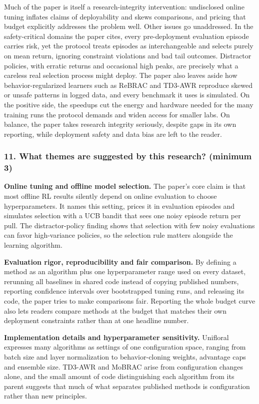 \documentclass[11pt]{article}
\newcommand{\question}[1]{\subsubsection*{#1}}
\begin{document}
Much of the paper is itself a research-integrity intervention: undisclosed online tuning inflates claims of deployability and skews comparisons, and pricing that budget explicitly addresses the problem well. Other issues go unaddressed. In the safety-critical domains the paper cites, every pre-deployment evaluation episode carries risk, yet the protocol treats episodes as interchangeable and selects purely on mean return, ignoring constraint violations and bad tail outcomes. Distractor policies, with erratic returns and occasional high peaks, are precisely what a careless real selection process might deploy. The paper also leaves aside how behavior-regularized learners such as ReBRAC and TD3-AWR reproduce skewed or unsafe patterns in logged data, and every benchmark it uses is simulated. On the positive side, the speedups cut the energy and hardware needed for the many training runs the protocol demands and widen access for smaller labs. On balance, the paper takes research integrity seriously, despite gaps in its own reporting, while deployment safety and data bias are left to the reader.

\question{11. What themes are suggested by this research? (minimum 3)}

\textbf{Online tuning and offline model selection.} The paper's core claim is that most offline RL results silently depend on online evaluation to choose hyperparameters. It names this setting, prices it in evaluation episodes and simulates selection with a UCB bandit that sees one noisy episode return per pull. The distractor-policy finding shows that selection with few noisy evaluations can favor high-variance policies, so the selection rule matters alongside the learning algorithm.

\textbf{Evaluation rigor, reproducibility and fair comparison.} By defining a method as an algorithm plus one hyperparameter range used on every dataset, rerunning all baselines in shared code instead of copying published numbers, reporting confidence intervals over bootstrapped tuning runs, and releasing its code, the paper tries to make comparisons fair. Reporting the whole budget curve also lets readers compare methods at the budget that matches their own deployment constraints rather than at one headline number.

\textbf{Implementation details and hyperparameter sensitivity.} Unifloral expresses many algorithms as settings of one configuration space, ranging from batch size and layer normalization to behavior-cloning weights, advantage caps and ensemble size. TD3-AWR and MoBRAC arise from configuration changes alone, and the small amount of code distinguishing each algorithm from its parent suggests that much of what separates published methods is configuration rather than new principles.
\end{document}
